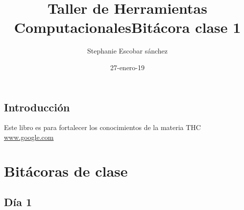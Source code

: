 \documentclass{book}
\title{Taller de Herramientas Computacionales}
\author{Stephanie Escobar sánchez}
\date{27-enero-19}
\begin{document}
	\maketitle

	\tableofcontents
	\section*{Introducción} Este libro es para fortalecer los conocimientos de la materia THC\\
	\url{www.google.com}\\


	\chapter{Bitácoras de clase}
	\section{Día 1}
	
	\title{\Huge Bitácora clase 1} \\
\end{document}
